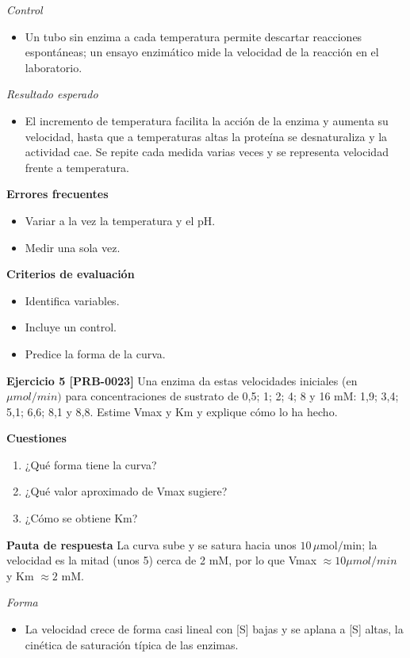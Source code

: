 \documentclass{book}
\begin{document}
\noindent\textit{Control}
\begin{itemize}
\item Un tubo sin enzima a cada temperatura permite descartar reacciones espontáneas; un ensayo enzimático mide la velocidad de la reacción en el laboratorio.
\end{itemize}

\noindent\textit{Resultado esperado}
\begin{itemize}
\item El incremento de temperatura facilita la acción de la enzima y aumenta su velocidad, hasta que a temperaturas altas la proteína se desnaturaliza y la actividad cae. Se repite cada medida varias veces y se representa velocidad frente a temperatura.
\end{itemize}

\noindent\textbf{Errores frecuentes}
\begin{itemize}
\item Variar a la vez la temperatura y el pH.
\item Medir una sola vez.
\end{itemize}

\noindent\textbf{Criterios de evaluación}
\begin{itemize}
\item Identifica variables.
\item Incluye un control.
\item Predice la forma de la curva.
\end{itemize}

\noindent\textbf{Ejercicio 5 [PRB-0023]}
Una enzima da estas velocidades iniciales (en \(\mu mol/min)\) para concentraciones de sustrato de 0,5; 1; 2; 4; 8 y 16 mM: 1,9; 3,4; 5,1; 6,6; 8,1 y 8,8. Estime Vmax y Km y explique cómo lo ha hecho.


\noindent\textbf{Cuestiones}
\begin{enumerate}
\item ¿Qué forma tiene la curva?
\item ¿Qué valor aproximado de Vmax sugiere?
\item ¿Cómo se obtiene Km?
\end{enumerate}

\noindent\textbf{Pauta de respuesta}
La curva sube y se satura hacia unos \(10\,\mu\mathrm{mol/min}\); la velocidad es la mitad (unos 5) cerca de 2 mM, por lo que Vmax \(\approx 10 \mu mol/min\) y Km \(\approx 2\) mM.


\noindent\textit{Forma}
\begin{itemize}
\item La velocidad crece de forma casi lineal con [S] bajas y se aplana a [S] altas, la cinética de saturación típica de las enzimas.
\end{itemize}
\end{document}
